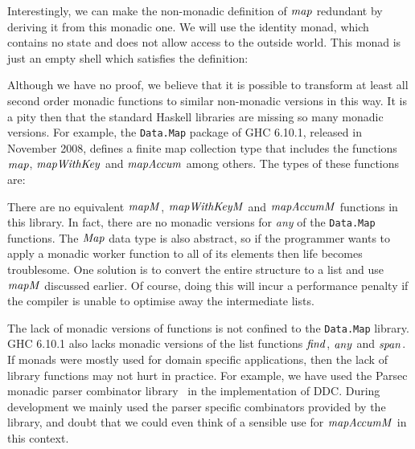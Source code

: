 Interestingly, we can make the non-monadic definition of $\operatorname{\mathit{map}}$ redundant by deriving it from this monadic one. We will use the identity monad, which contains no state and does not allow access to the outside world. This monad is just an empty shell which satisfies the definition:


Although we have no proof, we believe that it is possible to transform at least all second order monadic functions to similar non-monadic versions in this way. It is a pity then that the standard Haskell libraries are missing so many monadic versions. For example, the \texttt{Data.Map} package of GHC 6.10.1, released in November 2008, defines a finite map collection type that includes the functions $\operatorname{\mathit{map}}$, $\operatorname{\mathit{mapWithKey}}$ and $\operatorname{\mathit{mapAccum}}$ among others. The types of these functions are:


There are no equivalent $\operatorname{\mathit{mapM}}$, $\operatorname{\mathit{mapWithKeyM}}$ and $\operatorname{\mathit{mapAccumM}}$ functions in this library. In fact, there are no monadic versions for \emph{any} of the \texttt{Data.Map} functions. The $\operatorname{\mathit{Map}}$ data type is also abstract, so if the programmer wants to apply a monadic worker function to all of its elements then life becomes troublesome. One solution is to convert the entire structure to a list and use $\operatorname{\mathit{mapM}}$ discussed earlier. Of course, doing this will incur a performance penalty if the compiler is unable to optimise away the intermediate lists.

The lack of monadic versions of functions is not confined to the \texttt{Data.Map} library. GHC 6.10.1 also lacks monadic versions of the list functions $\operatorname{\mathit{find}}$, $\operatorname{\mathit{any}}$ and $\operatorname{\mathit{span}}$. If monads were mostly used for domain specific applications, then the lack of library functions may not hurt in practice. For example, we have used the Parsec monadic parser combinator library~\cite{leigen:parsec} in the implementation of DDC. During development we mainly used the parser specific combinators provided by the library, and doubt that we could even think of a sensible use for $\operatorname{\mathit{mapAccumM}}$ in this context.

